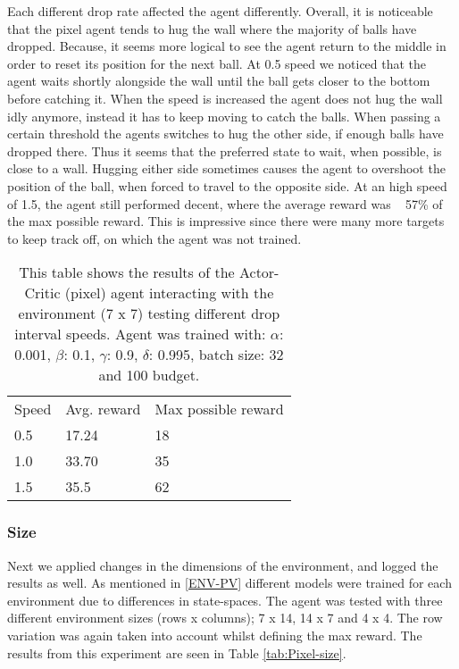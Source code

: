 \documentclass{article}
\begin{document}
Each different drop rate affected the agent differently. 
Overall, it is noticeable that the pixel agent tends to hug the wall where the majority of balls have dropped.
Because, it seems more logical to see the agent return to the middle in order to reset its position for the next ball.
At 0.5 speed we noticed that the agent waits shortly alongside the wall until the ball gets closer to the bottom before catching it. 
When the speed is increased the agent does not hug the wall idly anymore, instead it has to keep moving to catch the balls. 
When passing a certain threshold the agents switches to hug the other side, if enough balls have dropped there. 
Thus it seems that the preferred state to wait, when possible, is close to a wall. 
Hugging either side sometimes causes the agent to overshoot the position of the ball, when forced to travel to the opposite side. 
At an high speed of 1.5, the agent still performed decent, where the average reward was ~ 57\% of the max possible reward. 
This is impressive since there were many more targets to keep track off, on which the agent was not trained. 

\begin{table}[]
\begin{tabular}{lll}
Speed & Avg. reward & Max possible reward \\
0.5   & 17.24       & 18                  \\
1.0   & 33.70       & 35                  \\
1.5   & 35.5        & 62                 
\end{tabular}
\caption{This table shows the results of the Actor-Critic (pixel) agent interacting with the environment (7 x 7) testing different drop interval speeds.  Agent was trained with: $\alpha$: 0.001, $\beta$: 0.1, $\gamma$: 0.9, $\delta$: 0.995, batch size: 32 and 100 budget. }
\label{tab:Pixel-speed}
\end{table}

\subsubsection{Size}
Next we applied changes in the dimensions of the environment, and logged the results as well.
As mentioned in \ref{ENV-PV} different models were trained for each environment due to differences in state-spaces. 
The agent was tested with three different environment sizes (rows x columns); 7 x 14, 14 x 7 and 4 x 4. 
The row variation was again taken into account whilst defining the max reward. 
The results from this experiment are seen in Table \ref{tab:Pixel-size}.
\end{document}
